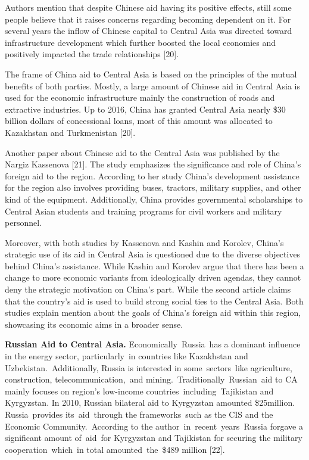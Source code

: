 Authors mention that despite Chinese aid having its positive effects,
still some people believe that it raises concerns regarding becoming
dependent on it. For several years the inflow of Chinese capital to
Central Asia was directed toward infrastructure development which
further boosted the local economies and positively impacted the trade
relationships {[}20{]}.

The frame of China aid to Central Asia is based on the principles of the
mutual benefits of both parties. Mostly, a large amount of Chinese aid
in Central Asia is used for the economic infrastructure mainly the
construction of roads and extractive industries. Up to 2016, China has
granted Central Asia nearly \$30 billion dollars of concessional loans,
most of this amount was allocated to Kazakhstan and Turkmenistan
{[}20{]}.

Another paper about Chinese aid to the Central Asia was published by the
Nargiz Kassenova {[}21{]}. The study emphasizes the significance and
role of China's foreign aid to the region. According to her study
China's development assistance for the region also involves providing
buses, tractors, military supplies, and other kind of the equipment.
Additionally, China provides governmental scholarships to Central Asian
students and training programs for civil workers and military personnel.

Moreover, with both studies by Kassenova and Kashin and Korolev, China's
strategic use of its aid in Central Asia is questioned due to the
diverse objectives behind China's assistance. While Kashin and Korolev
argue that there has been a change to more economic variants from
ideologically driven agendas, they cannot deny the strategic motivation
on China's part. While the second article claims that the country's aid
is used to build strong social ties to the Central Asia. Both studies
explain mention about the goals of China's foreign aid within this
region, showcasing its economic aims in a broader sense.

{\bfseries Russian Aid to Central Asia.} Economically~Russia~has a dominant
influence in the energy sector, particularly~in countries like
Kazakhstan and Uzbekistan.~Additionally, Russia is interested in
some~sectors~like agriculture, construction, telecommunication,~and
mining.~Traditionally~Russian~aid to CA mainly focuses on region's
low-income countries~including~Tajikistan and Kyrgyzstan. In 2010,
Russian bilateral aid to Kyrgyzstan amounted \$25million.
Russia~provides its~aid~through the frameworks~such as the CIS and the
Economic Community.~According to the author~in~recent~years~Russia
forgave a significant amount of~aid~for Kyrgyzstan and Tajikistan for
securing the military cooperation~which~in total amounted~the~\$489
million {[}22{]}.

